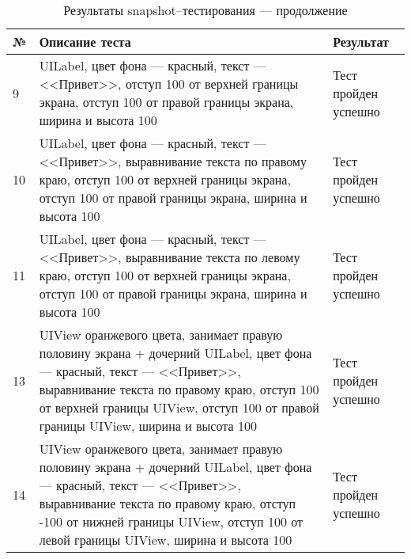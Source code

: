 \begin{table}[!htb]
 \label{table:tests2}
 \begin{center}
  \caption{Результаты snapshot--тестирования --- продолжение}
 \begin{tabular}{|p{0.6cm}|p{10cm}|p{5cm}|}
  \hline
   \bfseries № & \bfseries Описание теста & \bfseries Результат \\ \hline
    9 & UILabel, цвет фона --- красный, текст --- <<Привет>>, отступ 100 от верхней границы экрана, отступ 100 от правой границы экрана, ширина и высота 100 & Тест пройден успешно  \\ 
   10 & UILabel, цвет фона --- красный, текст --- <<Привет>>, выравнивание текста по правому краю, отступ 100 от верхней границы экрана, отступ 100 от правой границы экрана, ширина и высота 100 & Тест пройден успешно  \\ \hline
   11 & UILabel, цвет фона --- красный, текст --- <<Привет>>, выравнивание текста по левому краю, отступ 100 от верхней границы экрана, отступ 100 от правой границы экрана, ширина и высота 100 & Тест пройден успешно  \\ \hline
   13 & UIView оранжевого цвета, занимает правую половину экрана + дочерний UILabel, цвет фона --- красный, текст --- <<Привет>>, выравнивание текста по правому краю, отступ 100 от верхней границы UIView, отступ 100 от правой границы UIView, ширина и высота 100 & Тест пройден успешно  \\ \hline
   14 & UIView оранжевого цвета, занимает правую половину экрана + дочерний UILabel, цвет фона --- красный, текст --- <<Привет>>, выравнивание текста по правому краю, отступ -100 от нижней границы UIView, отступ 100 от левой границы UIView, ширина и высота 100 & Тест пройден успешно  \\ \hline
  \end{tabular}
 \end{center}
\end{table}

